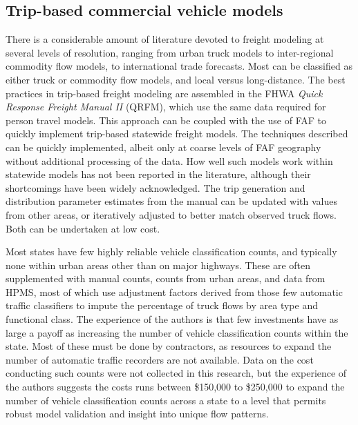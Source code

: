 \subsection{Trip-based commercial vehicle models}

There is a considerable amount of literature devoted to freight modeling at several levels of resolution, ranging from urban truck models to inter-regional commodity flow models, to international trade forecasts. Most can be classified as either truck or commodity flow models, and local versus long-distance. The best practices in trip-based freight modeling are assembled in the FHWA \textit{Quick Response Freight Manual II} (QRFM)\citep{beagan07}, which use the same data required for person travel models. This approach can be coupled with the use of FAF to quickly implement trip-based statewide freight models. The techniques described can be quickly implemented, albeit only at coarse levels of FAF geography without additional processing of the data. How well such models work within statewide models has not been reported in the literature, although their shortcomings have been widely acknowledged. The trip generation and distribution parameter estimates from the manual can be updated with values from other areas, or iteratively adjusted to better match observed truck flows. Both can be undertaken at low cost.

Most states have few highly reliable vehicle classification counts, and typically none within urban areas other than on major highways. These are often supplemented with manual counts, counts from urban areas, and data from HPMS, most of which use adjustment factors derived from those few automatic traffic classifiers to impute the percentage of truck flows by area type and functional class. The experience of the authors is that few investments have as large a payoff as increasing the number of vehicle classification counts within the state. Most of these must be done by contractors, as resources to expand the number of automatic traffic recorders are not available. Data on the cost conducting such counts were not collected in this research, but the experience of the authors suggests the costs runs between \$150,000 to \$250,000 to expand the number of vehicle classification counts across a state to a level that permits robust model validation and insight into unique flow patterns.

